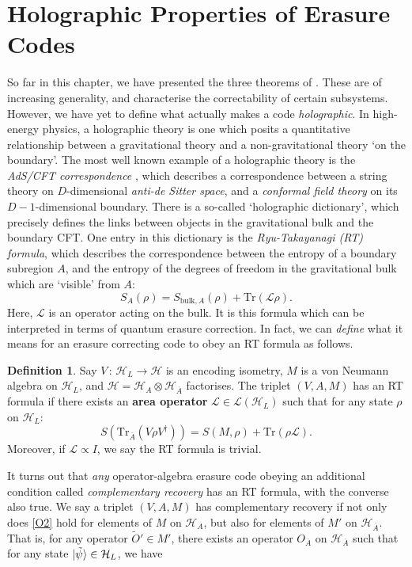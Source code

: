 \documentclass[12pt,a4paper]{report}
\numberwithin{equation}{section}
\newcommand{\ol}[1]{\overline{#1}}
\newcommand{\tr}{\text{Tr}}
\theoremstyle{definition}
\newtheorem{definition}{Definition}[section]
\theoremstyle{theorem}
\theoremstyle{theorem}
\theoremstyle{example}
\theoremstyle{definition}
\begin{document}
\section{Holographic Properties of Erasure Codes}
So far in this chapter, we have presented the three theorems of \cite{Harlow}. These are of increasing generality, and characterise the correctability of certain subsystems. However, we have yet to define what actually makes a code \textit{holographic}. In high-energy physics, a holographic theory is one which posits a quantitative relationship between a gravitational theory and a non-gravitational theory `on the boundary'. The most well known example of a holographic theory is the \textit{AdS/CFT correspondence} \cite{Maldacena}, which describes a correspondence between a string theory on $D$-dimensional \textit{anti-de Sitter space}, and a \textit{conformal field theory} on its $D-1$-dimensional boundary. There is a so-called `holographic dictionary', which precisely defines the links between objects in the gravitational bulk and the boundary CFT. One entry in this dictionary is the \textit{Ryu-Takayanagi (RT) formula}, which describes the correspondence between the entropy of a boundary subregion $A$, and the entropy of the degrees of freedom in the gravitational bulk which are `visible' from $A$:
\begin{equation}
	S_{A}(\rho)=S_{\text{bulk},A}(\rho)+\tr(\mathcal{L}\rho).
\end{equation}
Here, $\mathcal{L}$ is an operator acting on the bulk. It is this formula which can be interpreted in terms of quantum erasure correction. In fact, we can \textit{define} what it means for an erasure correcting code to obey an RT formula as follows.
\begin{definition}
	Say $V\,:\,\mathcal{H}_{L}\to\mathcal{H}$ is an encoding isometry, $M$ is a von Neumann algebra on $\mathcal{H}_{L}$, and $\mathcal{H}=\mathcal{H}_{A}\otimes\mathcal{H}_{\ol{A}}$ factorises. The triplet $(V,A,M)$ has an RT formula if there exists an \textbf{area operator} $\mathcal{L}\in\mathcal{L}(\mathcal{H}_{L})$ such that for any state $\rho$ on $\mathcal{H}_{L}$:
	\begin{equation}
		S(\tr_{\ol{A}}(V\rho V^{\dagger}))=S(M,\rho)+\tr(\rho\mathcal{L}).
	\end{equation}
	Moreover, if $\mathcal{L}\propto I$, we say the RT formula is trivial.
\end{definition}
It turns out that \textit{any} operator-algebra erasure code obeying an additional condition called \textit{complementary recovery} has an RT formula, with the converse also true. We say a triplet $(V,A,M)$ has complementary recovery if not only does \ref{O2} hold for elements of $M$ on $\mathcal{H}_{A}$, but also for elements of $M'$ on $\mathcal{H}_{\ol{A}}$. That is, for any operator $\tilde{O}'\in M'$, there exists an operator $O_{\ol{A}}$ on $\mathcal{H}_{\ol{A}}$ such that for any state $\ket{\tilde{\psi}}\in\mathcal{H}_{L}$, we have
\end{document}
